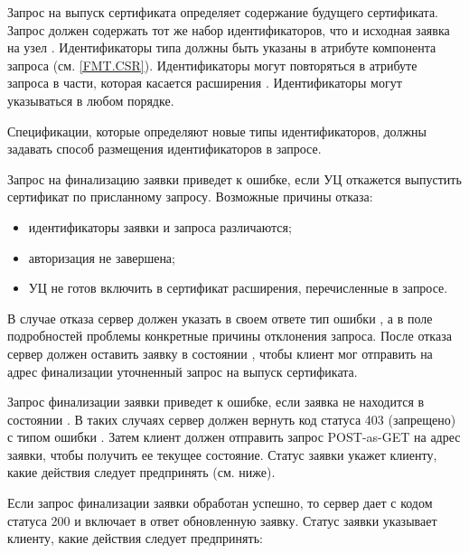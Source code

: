 Запрос на выпуск сертификата определяет содержание будущего сертификата.
Запрос должен содержать тот же набор идентификаторов, что и исходная заявка
на узел .
%
Идентификаторы типа  должны быть указаны в атрибуте  
компонента  запроса (см. \ref{FMT.CSR}).  
Идентификаторы могут повторяться в атрибуте  запроса в 
части, которая касается расширения . Идентификаторы 
могут указываться в любом порядке.

Спецификации, которые определяют новые типы идентификаторов, должны 
задавать способ размещения идентификаторов в запросе.

Запрос на финализацию заявки приведет к ошибке, если УЦ откажется 
выпустить сертификат по присланному запросу. Возможные причины отказа:
%
\begin{itemize}
\item
идентификаторы заявки и запроса различаются;
\item
авторизация не завершена;
\item
УЦ не готов включить в сертификат расширения, перечисленные в запросе.
\end{itemize}

В случае отказа сервер должен указать в своем ответе тип ошибки ,
а в поле  подробностей проблемы конкретные причины отклонения 
запроса. После отказа сервер должен оставить заявку в состоянии , 
чтобы клиент мог отправить на адрес финализации уточненный запрос на выпуск 
сертификата.

Запрос финализации заявки приведет к ошибке, если заявка не находится в 
состоянии . В таких случаях сервер должен вернуть код статуса 
403 (запрещено) с типом ошибки . Затем клиент должен 
отправить запрос POST-as-GET на адрес заявки, чтобы получить ее текущее 
состояние. Статус заявки укажет клиенту, какие действия следует предпринять 
(см. ниже). 

Если запрос финализации заявки обработан успешно, то сервер дает 
 с кодом статуса 200 и включает в ответ 
обновленную заявку. Статус заявки указывает клиенту, какие действия следует 
предпринять:

